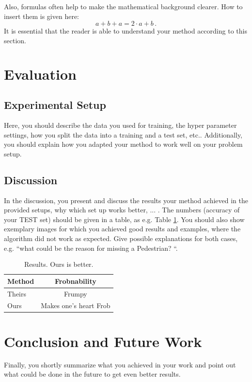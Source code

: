 \documentclass[10pt,twocolumn,letterpaper]{article}
\begin{document}
Also, formulas often help to make the mathematical background clearer. How to insert them is given here: 
$$a + b + a = 2 \cdot a + b\,.$$
It is essential that the reader is able to understand your method according to this section.

\section{Evaluation}
\subsection{Experimental Setup}
Here, you should describe the data you used for training, the hyper parameter settings, how you split the data into a training and a test set, etc.. Additionally, you should explain how you adapted your method to work well on your problem setup.




\subsection{Discussion}
In the discussion, you present and discuss the results your method achieved in the provided setups, why which set up works better, ... . The numbers (accuracy of your TEST set) should be given in a table, as e.g. Table \ref{tab:results}. You should also show exemplary images for which you achieved good results and examples, where the algorithm did not work as expected. Give possible explanations for both cases, e.g. ``what could be the reason for missing a Pedestrian? ``.

\begin{table}
	\begin{center}
		\begin{tabular}{|l|c|}
			\hline
			Method & Frobnability \\
			\hline\hline
			Theirs & Frumpy \\
			Ours & Makes one's heart Frob\\
			\hline
		\end{tabular}
	\end{center}
	\caption{Results. Ours is better.}
	\label{tab:results}
\end{table}

\section{Conclusion and Future Work}
Finally, you shortly summarize what you achieved in your work and point out what could be done in the future to get even better results. 










{\small


}
\end{document}
